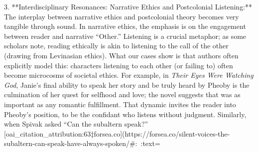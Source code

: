 \documentclass[12pt]{report}
\begin{document}
3. **Interdisciplinary Resonances: Narrative Ethics and Postcolonial Listening:** The interplay between narrative ethics and postcolonial theory becomes very tangible through sound. In narrative ethics, the emphasis is on the engagement between reader and narrative “Other.” Listening is a crucial metaphor; as some scholars note, reading ethically is akin to listening to the call of the other (drawing from Levinasian ethics). What our cases show is that authors often explicitly model this: characters listening to each other (or failing to) often become microcosms of societal ethics. For example, in \textit{Their Eyes Were Watching God}, Janie’s final ability to speak her story and be truly heard by Pheoby is the culmination of her quest for selfhood and love; the novel suggests that was as important as any romantic fulfillment. That dynamic invites the reader into Pheoby’s position, to be the confidant who listens without judgment. Similarly, when Spivak asked “Can the subaltern speak?” [oai_citation_attribution:63‡forsea.co](https://forsea.co/silent-voices-the-subaltern-can-speak-have-always-spoken/#:~:text=%
\end{document}

